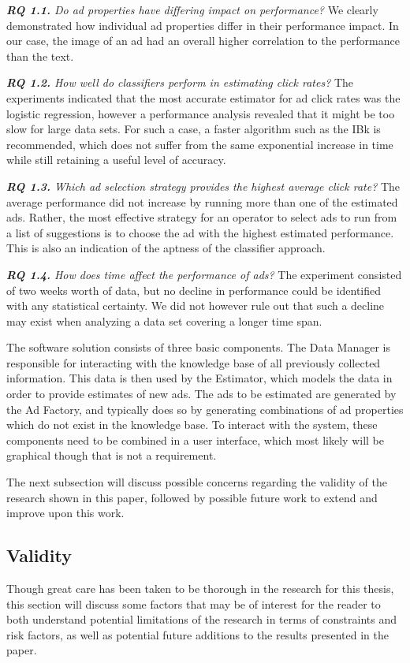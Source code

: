 \documentclass{sig-alternate}
\begin{document}
\textit{\textbf{RQ 1.1.} Do ad properties have differing impact on performance?}
We clearly demonstrated how individual ad properties differ in their performance impact. In our case, the image of an ad had an overall higher correlation to the performance than the text.

\textit{\textbf{RQ 1.2.} How well do classifiers perform in estimating click rates?}
The experiments indicated that the most accurate estimator for ad click rates was the logistic regression, however a performance analysis revealed that it might be too slow for large data sets. For such a case, a faster algorithm such as the IBk is recommended, which does not suffer from the same exponential increase in time while still retaining a useful level of accuracy.

\textit{\textbf{RQ 1.3.} Which ad selection strategy provides the highest average click rate?}
The average performance did not increase by running more than one of the estimated ads. Rather, the most effective strategy for an operator to select ads to run from a list of suggestions is to choose the ad with the highest estimated performance. This is also an indication of the aptness of the classifier approach.

\textit{\textbf{RQ 1.4.} How does time affect the performance of ads?}
The experiment consisted of two weeks worth of data, but no decline in performance could be identified with any statistical certainty. We did not however rule out that such a decline may exist when analyzing a data set covering a longer time span.

The software solution consists of three basic components. The Data Manager is responsible for interacting with the knowledge base of all previously collected information. This data is then used by the Estimator, which models the data in order to provide estimates of new ads. The ads to be estimated are generated by the Ad Factory, and typically does so by generating combinations of ad properties which do not exist in the knowledge base. To interact with the system, these components need to be combined in a user interface, which most likely will be graphical though that is not a requirement.

The next subsection will discuss possible concerns regarding the validity of the research shown in this paper, followed by possible future work to extend and improve upon this work.

\subsection{Validity}
Though great care has been taken to be thorough in the research for this thesis, this section will discuss some factors that may be of interest for the reader to both understand potential limitations of the research in terms of constraints and risk factors, as well as potential future additions to the results presented in the paper.
\end{document}
